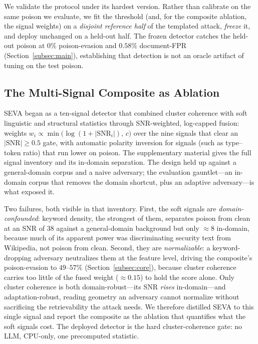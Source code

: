 \documentclass[conference]{IEEEtran}
\begin{document}
We validate the protocol under its hardest version. Rather than calibrate on the
same poison we evaluate, we fit the threshold (and, for the composite ablation, the
signal weights) on a \emph{disjoint reference half} of the templated attack,
\emph{freeze} it, and deploy unchanged on a held-out half. The frozen detector
catches the held-out poison at $0\%$ poison-evasion and $0.58\%$ document-FPR
(Section~\ref{subsec:main}), establishing that detection is not an oracle artifact
of tuning on the test poison.

\subsection{The Multi-Signal Composite as Ablation}
SEVA began as a ten-signal detector that combined cluster coherence with soft
linguistic and structural statistics through SNR-weighted, log-capped fusion:
weights $w_i \propto \min\!\big(\log(1+|\mathrm{SNR}_i|),\,c\big)$ over the nine
signals that clear an $|\mathrm{SNR}|\geq0.5$ gate, with automatic polarity
inversion for signals (such as type--token ratio) that run lower on poison.
The supplementary material gives the full signal inventory and its in-domain separation. The
design held up against a general-domain corpus and a naive adversary; the
evaluation gauntlet---an in-domain corpus that removes the domain shortcut, plus an
adaptive adversary---is what exposed it.

Two failures, both visible in that inventory. First, the soft signals are
\emph{domain-confounded}: keyword density, the strongest of them, separates poison
from clean at an SNR of $38$ against a general-domain background but only
$\approx\!8$ in-domain, because much of its apparent power was discriminating
security text from Wikipedia, not poison from clean.
Second, they are \emph{normalizable}: a keyword-dropping adversary neutralizes them
at the feature level, driving the composite's poison-evasion to $49$--$57\%$
(Section~\ref{subsec:core}), because cluster coherence carries too little of the
fused weight ($\approx\!0.15$) to hold the score alone.
Only cluster coherence is both domain-robust---its SNR \emph{rises} in-domain---and
adaptation-robust, reading geometry an adversary cannot normalize without
sacrificing the retrievability the attack needs. We therefore distilled SEVA to
this single signal and report the composite as the ablation that quantifies what
the soft signals cost. The deployed detector is the hard cluster-coherence gate: no
LLM, CPU-only, one precomputed statistic.
\end{document}
